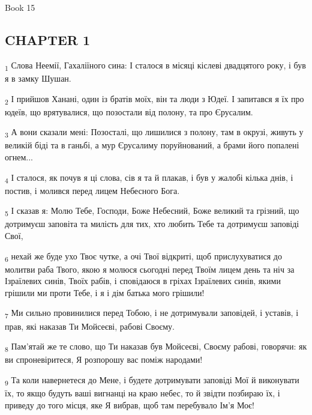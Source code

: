 Book 15
\subsection{CHAPTER 1}
\begin{tcolorbox}
\textsubscript{1} Слова Неемії, Гахаліїного сина: І сталося в місяці кіслеві двадцятого року, і був я в замку Шушан.
\end{tcolorbox}
\begin{tcolorbox}
\textsubscript{2} І прийшов Ханані, один із братів моїх, він та люди з Юдеї. І запитався я їх про юдеїв, що врятувалися, що позостали від полону, та про Єрусалим.
\end{tcolorbox}
\begin{tcolorbox}
\textsubscript{3} А вони сказали мені: Позосталі, що лишилися з полону, там в окрузі, живуть у великій біді та в ганьбі, а мур Єрусалиму поруйнований, а брами його попалені огнем...
\end{tcolorbox}
\begin{tcolorbox}
\textsubscript{4} І сталося, як почув я ці слова, сів я та й плакав, і був у жалобі кілька днів, і постив, і молився перед лицем Небесного Бога.
\end{tcolorbox}
\begin{tcolorbox}
\textsubscript{5} І сказав я: Молю Тебе, Господи, Боже Небесний, Боже великий та грізний, що дотримуєш заповіта та милість для тих, хто любить Тебе та дотримуєш заповіді Свої,
\end{tcolorbox}
\begin{tcolorbox}
\textsubscript{6} нехай же буде ухо Твоє чутке, а очі Твої відкриті, щоб прислухуватися до молитви раба Твого, якою я молюся сьогодні перед Твоїм лицем день та ніч за Ізраїлевих синів, Твоїх рабів, і сповідаюся в гріхах Ізраїлевих синів, якими грішили ми проти Тебе, і я і дім батька мого грішили!
\end{tcolorbox}
\begin{tcolorbox}
\textsubscript{7} Ми сильно провинилися перед Тобою, і не дотримували заповідей, і уставів, і прав, які наказав Ти Мойсеєві, рабові Своєму.
\end{tcolorbox}
\begin{tcolorbox}
\textsubscript{8} Пам'ятай же те слово, що Ти наказав був Мойсеєві, Своєму рабові, говорячи: як ви спроневіритеся, Я розпорошу вас поміж народами!
\end{tcolorbox}
\begin{tcolorbox}
\textsubscript{9} Та коли навернетеся до Мене, і будете дотримувати заповіді Мої й виконувати їх, то якщо будуть ваші вигнанці на краю небес, то й звідти позбираю їх, і приведу до того місця, яке Я вибрав, щоб там перебувало Ім'я Моє!
\end{tcolorbox}
